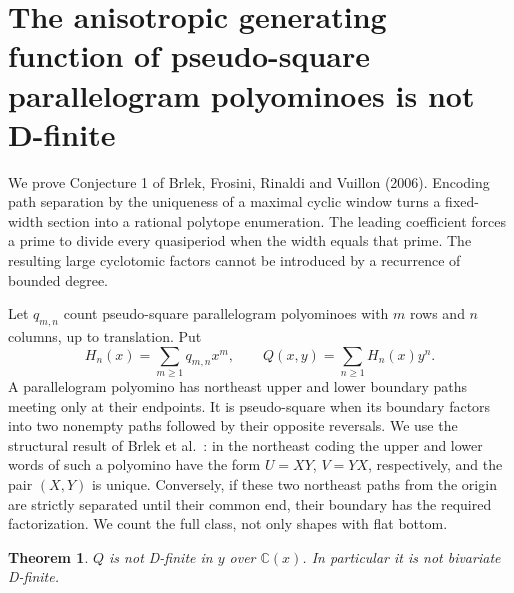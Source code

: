 \documentclass[11pt,a4paper]{article}
\numberwithin{equation}{section}
\newtheorem{theorem}{Theorem}[section]
\theoremstyle{definition}
\theoremstyle{remark}
\newenvironment{sectionabstract}{\par\smallskip\begingroup\small\noindent}{\par\endgroup\medskip}
\begin{document}
\begingroup

\section{\texorpdfstring{The anisotropic generating function of pseudo-square parallelogram polyominoes is not D-finite}{The anisotropic generating function of pseudo-square parallelogram polyominoes is not D-finite}}\label{section:r42taisho}
\par\medskip


\begin{sectionabstract}
We prove Conjecture 1 of Brlek, Frosini, Rinaldi and Vuillon (2006).
Encoding path separation by the uniqueness of a maximal cyclic window
turns a fixed-width section into a rational polytope enumeration.
The leading coefficient forces a prime to divide every quasiperiod
when the width equals that prime. The resulting large cyclotomic
factors cannot be introduced by a recurrence of bounded degree.
\end{sectionabstract}

Let $q_{m,n}$ count pseudo-square parallelogram polyominoes with
$m$ rows and $n$ columns, up to translation. Put
\[
 H_n(x)=\sum_{m\ge1}q_{m,n}x^m,\qquad
 Q(x,y)=\sum_{n\ge1}H_n(x)y^n.
\]
A parallelogram polyomino has northeast upper and lower boundary
paths meeting only at their endpoints. It is pseudo-square when its
boundary factors into two nonempty paths followed by their opposite
reversals. We use the structural result of Brlek et al.\
\cite[Prop.~3.3 and the preceding characterization]{r42taisho:BFRV}: in the
northeast coding the upper and lower words of such a polyomino have
the form $U=XY$, $V=YX$, respectively, and the pair $(X,Y)$
is unique. Conversely, if these two northeast paths from the origin
are strictly separated until their common end, their boundary has the
required factorization. We count the full class, not only shapes with
flat bottom.
\begin{theorem}
$Q$ is not D-finite in $y$ over $\mathbb C(x)$.
In particular it is not bivariate D-finite.
\end{theorem}
\end{document}
